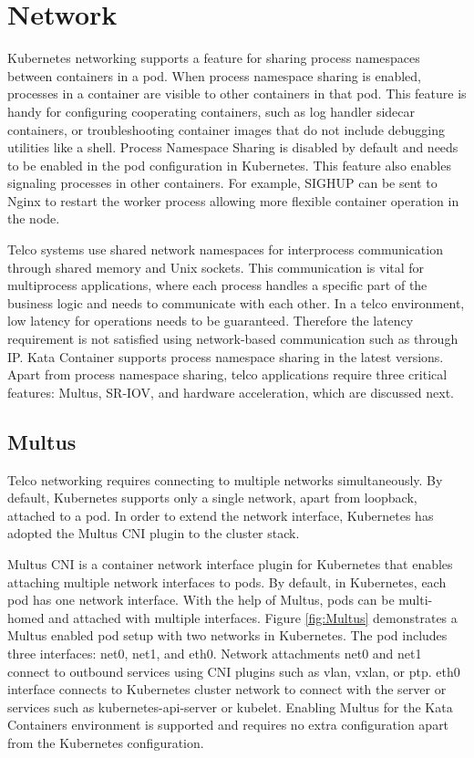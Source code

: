 \section{Network}

Kubernetes networking supports a feature for sharing process namespaces between containers in a pod. When process namespace sharing is enabled, processes in a container are visible to other containers in that pod. This feature is handy for configuring cooperating containers, such as log handler sidecar containers, or troubleshooting container images that do not include debugging utilities like a shell. Process Namespace Sharing is disabled by default and needs to be enabled in the pod configuration in Kubernetes. This feature also enables signaling processes in other containers. For example, SIGHUP can be sent to Nginx to restart the worker process allowing more flexible container operation in the node. \cite{ShareProcessNamespaceKubernetes}

Telco systems use shared network namespaces for interprocess communication through shared memory and Unix sockets. This communication is vital for multiprocess applications, where each process handles a specific part of the business logic and needs to communicate with each other. In a telco environment, low latency for operations needs to be guaranteed. Therefore the latency requirement is not satisfied using network-based communication such as through IP. Kata Container supports process namespace sharing in the latest versions. Apart from process namespace sharing, telco applications require three critical features: Multus, SR-IOV, and hardware acceleration, which are discussed next.

\subsection{Multus}

Telco networking requires connecting to multiple networks simultaneously. By default, Kubernetes supports only a single network, apart from loopback, attached to a pod. In order to extend the network interface, Kubernetes has adopted the Multus CNI plugin to the cluster stack.

Multus CNI \cite{Multus} is a container network interface plugin for Kubernetes that enables attaching multiple network interfaces to pods. By default, in Kubernetes, each pod has one network interface. With the help of Multus, pods can be multi-homed and attached with multiple interfaces. Figure \ref{fig:Multus} demonstrates a Multus enabled pod setup with two networks in Kubernetes. The pod includes three interfaces: net0, net1, and eth0. Network attachments net0 and net1 connect to outbound services using CNI plugins such as vlan, vxlan, or ptp. eth0 interface connects to Kubernetes cluster network to connect with the server or services such as kubernetes-api-server or kubelet. Enabling Multus for the Kata Containers environment is supported and requires no extra configuration apart from the Kubernetes configuration. \cite{MultusUbuntu}

